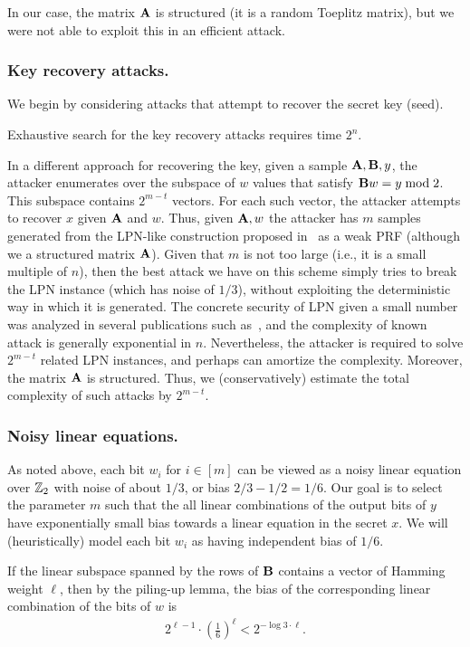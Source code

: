 In our case, the matrix $\mat{A}$ is structured (it is a random Toeplitz matrix),
but we were not able to exploit this in an efficient attack.



\subsubsection{Key recovery attacks.}
We begin by considering attacks that attempt to recover the secret key (seed).

Exhaustive search for the key recovery attacks requires time $2^n$.

In a different approach for recovering the key, given a sample $\mat{A},\mat{B},y$,
the attacker enumerates over the subspace of $w$ values that satisfy $\mat{B} w = y \bmod 2$.
This subspace contains $2^{m - t}$ vectors. For each such vector, the attacker attempts to recover $x$
given $\mat{A}$ and $w$. Thus, given $\mat{A},w$ the attacker has $m$ samples
generated from the LPN-like construction proposed in~\cite{boneh2018-darkmatter} as a weak PRF
(although we a structured matrix $\mat{A}$).
Given that $m$ is not too large (i.e., it is a small multiple of $n$),
then the best attack we have on this scheme simply tries to break the LPN instance (which has noise of $1/3$),
without exploiting the deterministic way in which it is generated.
The concrete security of LPN given a small number was analyzed in several publications such as~\cite{EsserKM17},
and the complexity of known attack is generally exponential in $n$.
Nevertheless, the attacker is required to solve $2^{m - t}$ related LPN instances,
and perhaps can amortize the complexity. Moreover, the matrix $\mat{A}$ is structured.
Thus, we (conservatively) estimate the total complexity of such attacks by $2^{m - t}$.

\subsubsection{Noisy linear equations.}

As noted above, each bit $w_i$ for $i \in [m]$ can be viewed as a noisy linear equation over $\mathbb{Z}_2$
with noise of about $1/3$, or bias $2/3 - 1/2 = 1/6$.
Our goal is to select the parameter $m$ such that
the all linear combinations of the output bits of $y$
have exponentially small bias towards a linear equation in the secret $x$.
We will (heuristically) model each bit $w_i$ as having independent bias of $1/6$.

If the linear subspace spanned by the rows of $\mat{B}$ contains a vector of Hamming weight $\ell$,
then by the piling-up lemma, the bias of the corresponding linear combination of the bits of $w$ is
\begin{align}\label{eq:bias_linear}
2^{\ell - 1} \cdot (\tfrac{1}{6})^{\ell} < 2^{-\log 3 \cdot \ell}.
\end{align}

